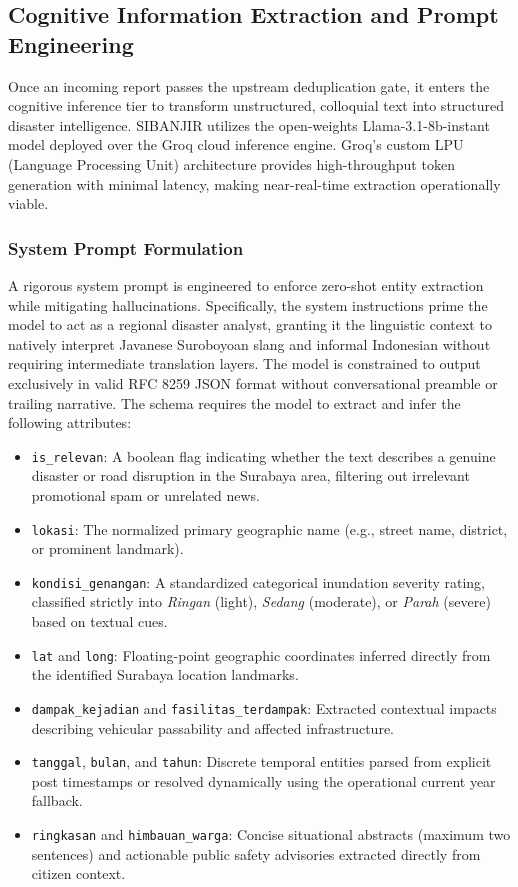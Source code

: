 \documentclass[conference]{IEEEtran}
\begin{document}
\subsection{Cognitive Information Extraction and Prompt Engineering}

Once an incoming report passes the upstream deduplication gate, it enters the cognitive inference tier to transform unstructured, colloquial text into structured disaster intelligence. SIBANJIR utilizes the open-weights Llama-3.1-8b-instant model deployed over the Groq cloud inference engine. Groq's custom LPU (Language Processing Unit) architecture provides high-throughput token generation with minimal latency, making near-real-time extraction operationally viable.

\subsubsection{System Prompt Formulation}
A rigorous system prompt is engineered to enforce zero-shot entity extraction while mitigating hallucinations. Specifically, the system instructions prime the model to act as a regional disaster analyst, granting it the linguistic context to natively interpret Javanese Suroboyoan slang and informal Indonesian without requiring intermediate translation layers. The model is constrained to output exclusively in valid RFC 8259 JSON format without conversational preamble or trailing narrative. The schema requires the model to extract and infer the following attributes:

\begin{itemize}
    \item \texttt{is\_relevan}: A boolean flag indicating whether the text describes a genuine disaster or road disruption in the Surabaya area, filtering out irrelevant promotional spam or unrelated news.
    \item \texttt{lokasi}: The normalized primary geographic name (e.g., street name, district, or prominent landmark).
    \item \texttt{kondisi\_genangan}: A standardized categorical inundation severity rating, classified strictly into \textit{Ringan} (light), \textit{Sedang} (moderate), or \textit{Parah} (severe) based on textual cues.
    \item \texttt{lat} and \texttt{long}: Floating-point geographic coordinates inferred directly from the identified Surabaya location landmarks.
    \item \texttt{dampak\_kejadian} and \texttt{fasilitas\_terdampak}: Extracted contextual impacts describing vehicular passability and affected infrastructure.
    \item \texttt{tanggal}, \texttt{bulan}, and \texttt{tahun}: Discrete temporal entities parsed from explicit post timestamps or resolved dynamically using the operational current year fallback.
    \item \texttt{ringkasan} and \texttt{himbauan\_warga}: Concise situational abstracts (maximum two sentences) and actionable public safety advisories extracted directly from citizen context.
\end{itemize}
\end{document}

